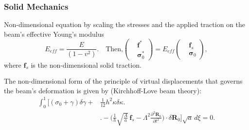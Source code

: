 \documentclass{beamer}
\begin{document}
\begin{frame}
	\frametitle{Solid Mechanics}
	\begin{overlayarea}{\textwidth}{\textheight}
		Non-dimensional equation by scaling the stresses
		and the applied traction on the beam’s effective Young’s modulus
	\begin{equation*}
		\label{eqn:29}
		E_{eff}=\frac{E}{(1-v^2)}. \quad \text{Then,}	\left(\begin{aligned}
			&\mathbf{f^*} \\
			&\mathbf{\sigma}_0^*
		\end{aligned}\right)
		=E_{eff}\left(\begin{aligned}
			&\textbf{f}_{s} \\
			&\mathbf{\sigma}_0
		\end{aligned}\right),
	\end{equation*}
where $\textbf{f}_{s}$ is the non-dimensional solid traction.
\vspace{0.35cm}
  
  The non-dimensional form of the principle of virtual displacements that governs the beam's deformation is given by (Kirchhoff-Love beam theory):
  \vspace{-0.2cm}
\begin{equation*}
	\begin{aligned}
		\int_0^1 \Bigg[ (\sigma_0 + \gamma) \delta \gamma 
		+ &\frac{1}{12} h^2 \kappa \delta \kappa \Bigg. \\
		&\Bigg. - \Bigg( \frac{1}{h} \sqrt{\frac{A}{a}}\, \textbf{f}_s - \Lambda^2 \frac{\partial^2 \textbf{R}_0}{\partial t^2} \Bigg) 
		\cdot \delta \textbf{R}_0 \Bigg] \sqrt{a}\, d\xi = 0.
	\end{aligned}
\end{equation*}
	\end{overlayarea}
\end{frame}

\end{document}
